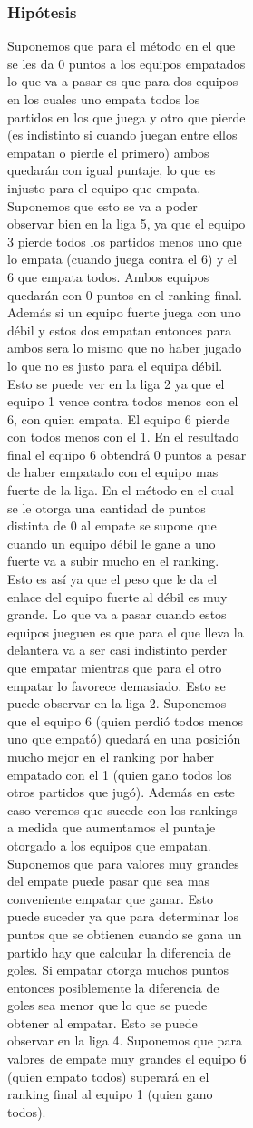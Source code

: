 \begin{figure}[h]
\begin{figure}[h]
\begin{figure}[h]
            \subsubsection*{Hipótesis}
            Suponemos que para el método en el que se les da 0 puntos a los equipos empatados lo que va a pasar es que para dos equipos en los cuales uno empata todos los partidos en los que juega y otro que pierde (es indistinto si cuando juegan entre ellos empatan o pierde el primero) ambos quedarán con igual puntaje, lo que es injusto para el equipo que empata. Suponemos que esto se va a poder observar bien en la liga 5, ya que el equipo 3 pierde todos los partidos menos uno que lo empata (cuando juega contra el 6) y el 6 que empata todos. Ambos equipos quedarán con 0 puntos en el ranking final. Además si un equipo fuerte juega con uno débil y estos dos empatan entonces para ambos sera lo mismo que no haber jugado lo que no es justo para el equipa débil. Esto se puede ver en la liga 2 ya que el equipo 1 vence contra todos menos con el 6, con quien empata. El equipo 6 pierde con todos menos con el 1. En el resultado final el equipo 6 obtendrá 0 puntos a pesar de haber empatado con el equipo mas fuerte de la liga.
            En el método en el cual se le otorga una cantidad de puntos distinta de 0 al empate se supone que cuando un equipo débil le gane a uno fuerte va a subir mucho en el ranking. Esto es así ya que el peso que le da el enlace del equipo fuerte al débil es muy grande. Lo que va a pasar cuando estos equipos jueguen es que para el que lleva la delantera va a ser casi indistinto perder que empatar mientras que para el otro empatar lo favorece demasiado. Esto se puede observar en la liga 2. Suponemos que el equipo 6 (quien perdió todos menos uno que empató) quedará en una posición mucho mejor en el ranking por haber empatado con el 1 (quien gano todos los otros partidos que jugó). Además en este caso veremos que sucede con los rankings a medida que aumentamos el puntaje otorgado a los equipos que empatan. Suponemos que para valores muy grandes del empate puede pasar que sea mas conveniente empatar que ganar. Esto puede suceder ya que para determinar los puntos que se obtienen cuando se gana un partido hay que calcular la diferencia de goles. Si empatar otorga muchos puntos entonces posiblemente la diferencia de goles sea menor que lo que se puede obtener al empatar. Esto se puede observar en la liga 4. Suponemos que para valores de empate muy grandes el equipo 6 (quien empato todos) superará en el ranking final al equipo 1 (quien gano todos).

\end{figure}
\end{figure}
\end{figure}
